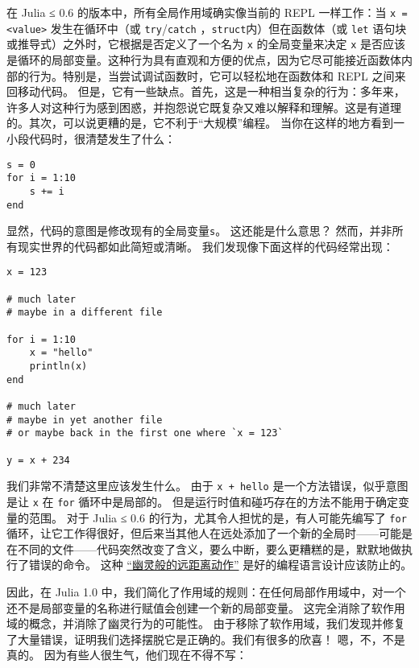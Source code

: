 在 Julia ≤ 0.6 的版本中，所有全局作用域确实像当前的 REPL 一样工作：当 \texttt{x = <value>} 发生在循环中（或 \texttt{try}/\texttt{catch} ，\texttt{struct}内）但在函数体（或 \texttt{let} 语句块或推导式）之外时，它根据是否定义了一个名为 \texttt{x} 的全局变量来决定 \texttt{x} 是否应该是循环的局部变量。这种行为具有直观和方便的优点，因为它尽可能接近函数体内部的行为。特别是，当尝试调试函数时，它可以轻松地在函数体和 REPL 之间来回移动代码。 但是，它有一些缺点。首先，这是一种相当复杂的行为：多年来，许多人对这种行为感到困惑，并抱怨说它既复杂又难以解释和理解。这是有道理的。其次，可以说更糟的是，它不利于“大规模”编程。 当你在这样的地方看到一小段代码时，很清楚发生了什么：




\begin{verbatim}
s = 0
for i = 1:10
    s += i
end
\end{verbatim}



显然，代码的意图是修改现有的全局变量\texttt{s}。 这还能是什么意思？ 然而，并非所有现实世界的代码都如此简短或清晰。 我们发现像下面这样的代码经常出现：




\begin{verbatim}
x = 123

# much later
# maybe in a different file

for i = 1:10
    x = "hello"
    println(x)
end

# much later
# maybe in yet another file
# or maybe back in the first one where `x = 123`

y = x + 234
\end{verbatim}



我们非常不清楚这里应该发生什么。 由于 \texttt{x + {\textquotedbl}hello{\textquotedbl}} 是一个方法错误，似乎意图是让 \texttt{x} 在 \texttt{for} 循环中是局部的。 但是运行时值和碰巧存在的方法不能用于确定变量的范围。 对于 Julia ≤ 0.6 的行为，尤其令人担忧的是，有人可能先编写了 \texttt{for} 循环，让它工作得很好，但后来当其他人在远处添加了一个新的全局时——可能是在不同的文件——代码突然改变了含义，要么中断，要么更糟糕的是，默默地做执行了错误的命令。 这种 \href{https://en.wikipedia.org/wiki/Action\_at\_a\_distance\_(computer\_programming)}{“幽灵般的远距离动作”} 是好的编程语言设计应该防止的。



因此，在 Julia 1.0 中，我们简化了作用域的规则：在任何局部作用域中，对一个还不是局部变量的名称进行赋值会创建一个新的局部变量。 这完全消除了软作用域的概念，并消除了幽灵行为的可能性。 由于移除了软作用域，我们发现并修复了大量错误，证明我们选择摆脱它是正确的。我们有很多的欣喜！ 嗯，不，不是真的。 因为有些人很生气，他们现在不得不写：




